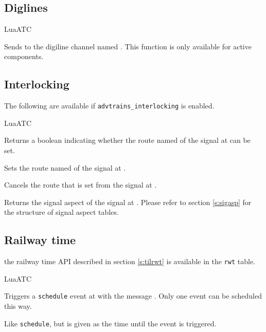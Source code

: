 \subsection{Diglines}
\begin{apidoc}{LuaATC}
\item {} Sends  to the digiline channel named . This function is only available for active components.
\end{apidoc}

\subsection{Interlocking}
The following are available if \texttt{advtrains\_interlocking} is enabled.
\begin{apidoc}{LuaATC}
\item {} Returns a boolean indicating whether the route named  of the signal at  can be set.
\item {} Sets the route named  of the signal at .
\item {} Cancels the route that is set from the signal at .
\item {} Returns the signal aspect of the signal at . Please refer to section \ref{s:sigasp} for the structure of signal aspect tables.
\end{apidoc}

\subsection{Railway time}
the railway time API described in section \ref{s:tilrwt} is available in the \texttt{rwt} table.
\begin{apidoc}{LuaATC}
\item {} Triggers a \texttt{schedule} event at  with the message . Only one event can be scheduled this way.
\item {} Like \texttt{schedule}, but  is given as the time until the event is triggered.
\end{apidoc}

